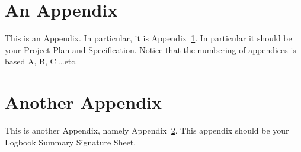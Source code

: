 \chapter{An Appendix}\label{app:an}
This is an Appendix. In particular, it is Appendix~\ref{app:an}. In particular
it should be your Project Plan and Specification. Notice that the numbering of
appendices is based A, B, C \ldots etc.

\chapter{Another Appendix}\label{app:another}

This is another Appendix, namely Appendix~\ref{app:another}. This appendix
should be your Logbook Summary Signature Sheet.
